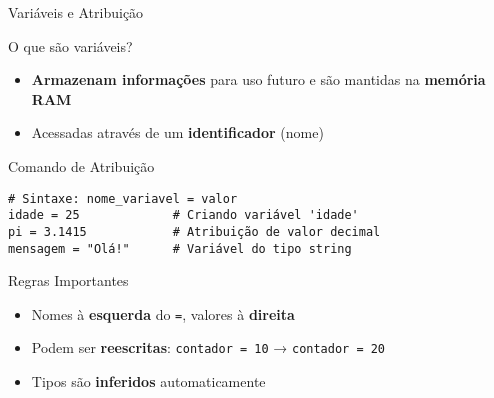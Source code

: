 \begin{frame}[fragile]{Variáveis e Atribuição}

    \begin{block}{O que são variáveis?}
        \begin{itemize}
            \item \textbf{Armazenam informações} para uso futuro e são mantidas na \textbf{memória RAM}
            \item Acessadas através de um \textbf{identificador} (nome)
        \end{itemize}
    \end{block}

    \begin{exampleblock}{Comando de Atribuição}
        \begin{verbatim}
# Sintaxe: nome_variavel = valor
idade = 25             # Criando variável 'idade'
pi = 3.1415            # Atribuição de valor decimal
mensagem = "Olá!"      # Variável do tipo string
\end{verbatim}
    \end{exampleblock}

    \begin{alertblock}{Regras Importantes}
        \begin{itemize}
            \item Nomes à \textbf{esquerda} do \texttt{=}, valores à \textbf{direita}
            \item Podem ser \textbf{reescritas}: \texttt{contador = 10} → \texttt{contador = 20}
            \item Tipos são \textbf{inferidos} automaticamente
        \end{itemize}
    \end{alertblock}
\end{frame}

